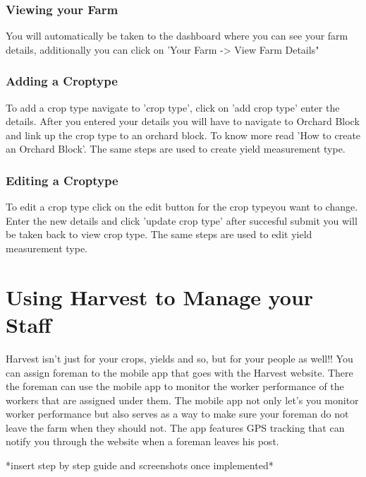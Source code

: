 \documentclass[11pt,fleqn]{book} %
\begin{document}
			\subsubsection{Viewing your Farm}
			You will automatically be taken to the dashboard where you can see your farm details, additionally you can click on 'Your Farm -> View Farm Details"
			
			\subsubsection{Adding a Croptype}
			To add a crop type navigate to 'crop type', click on 'add crop type' enter the details. After you entered your details you will have to navigate to Orchard Block and link up the crop type to an orchard block. To know more read 'How to create an Orchard Block'. The same steps are used to create yield measurement type.
			\subsubsection{Editing a Croptype}
			To edit a crop type click on the edit button for the crop typeyou want to change. Enter the new details and click 'update crop type' after succesful submit you will be taken back to view crop type. The same steps are used to edit yield measurement type.			
			
			
			
	\section{Using Harvest to Manage your Staff}
		Harvest isn't just for your crops, yields and so, but for your people as well!! You can assign foreman to the mobile app that goes with the Harvest website. There the foreman can use the mobile app to monitor the worker performance of the workers that are assigned under them. The mobile app not only let's you monitor worker performance but also serves as a way to make sure your foreman do not leave the farm when they should not. The app features GPS tracking that can notify you through the website when a foreman leaves his post.
		
		*insert step by step guide and screenshots once implemented*



\end{document}
